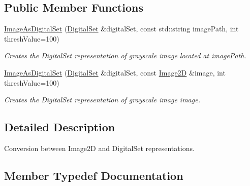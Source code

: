 \subsection*{Public Member Functions}
\begin{DoxyCompactItemize}
\item 
\mbox{\hyperlink{structDIPaCUS_1_1Representation_1_1ImageAsDigitalSet_a7e40656e617812a4be262273cff996ea}{Image\+As\+Digital\+Set}} (\mbox{\hyperlink{structDIPaCUS_1_1Representation_1_1ImageAsDigitalSet_a3a19b478392377afed24a5234dfdbd68}{Digital\+Set}} \&digital\+Set, const std\+::string image\+Path, int thresh\+Value=100)
\begin{DoxyCompactList}\small\item\em Creates the Digital\+Set representation of grayscale image located at image\+Path. \end{DoxyCompactList}\item 
\mbox{\hyperlink{structDIPaCUS_1_1Representation_1_1ImageAsDigitalSet_a26f61973ec8fa49b35bf303d1d34bd9b}{Image\+As\+Digital\+Set}} (\mbox{\hyperlink{structDIPaCUS_1_1Representation_1_1ImageAsDigitalSet_a3a19b478392377afed24a5234dfdbd68}{Digital\+Set}} \&digital\+Set, const \mbox{\hyperlink{structDIPaCUS_1_1Representation_1_1ImageAsDigitalSet_a594777514834a88dac93cac43b5e9324}{Image2D}} \&image, int thresh\+Value=100)
\begin{DoxyCompactList}\small\item\em Creates the Digital\+Set representation of grayscale image image. \end{DoxyCompactList}\end{DoxyCompactItemize}


\subsection{Detailed Description}
Conversion between Image2D and Digital\+Set representations. 



\subsection{Member Typedef Documentation}
\mbox{\label{structDIPaCUS_1_1Representation_1_1ImageAsDigitalSet_a3a19b478392377afed24a5234dfdbd68}} 
